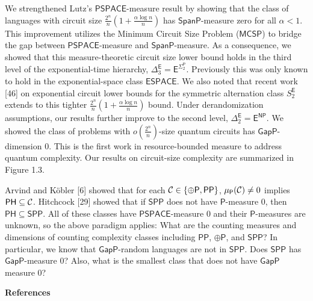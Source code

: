 We strengthened Lutz’s $\mathsf{PSPACE}$-measure result by showing that the class of languages with circuit size $\frac{2^{n}}{n}(1+\frac{\alpha\log n}{n})$ has $\mathsf{SpanP}$-measure zero for all $\alpha<1$. This improvement utilizes the Minimum Circuit Size Problem ($\mathsf{MCSP}$) to bridge the gap between $\mathsf{PSPACE}$-measure and $\mathsf{SpanP}$-measure. As a consequence, we showed that this measure-theoretic circuit size lower bound holds in the third level of the exponential-time hierarchy, $\Delta^{\mathsf{E}}_{3}=\mathsf{E}^{{\Sigma^{\mathsf{P}}_{2}}}$. Previously this was only known to hold in the exponential-space class $\mathsf{ESPACE}$. We also noted that recent work [46] on exponential circuit lower bounds for the symmetric alternation class $S^{\mathsf{E}}_{2}$ extends to this tighter $\frac{2^{n}}{n}(1+\frac{\alpha\log n}{n})$ bound. Under derandomization assumptions, our results further improve to the second level, $\Delta^{\mathsf{E}}_{2}=\mathsf{E}^{\mathsf{NP}}$. We showed the class of problems with $o\left(\frac{2^{n}}{n}\right)$-size quantum circuits has $\mathsf{GapP}$-dimension 0. This is the first work in resource-bounded measure to address quantum complexity.
Our results on circuit-size complexity are summarized in Figure 1.3.\par




Arvind and Köbler [6] showed that for
each ${\cal C}\in\{{\oplus\mathsf{P}},\mathsf{PP}\}$, $\mu_{\mathsf{P}}({\cal C})\not=0$ implies
$\mathsf{PH}\subseteq{\cal C}$. Hitchcock [29] showed that if $\mathsf{SPP}$ does not have $\mathsf{P}$-measure 0, then $\mathsf{PH}\subseteq\mathsf{SPP}$.
All of these classes have $\mathsf{PSPACE}$-measure 0 and their $\mathsf{P}$-measures are unknown, so the above paradigm applies:
What are the counting measures and dimensions of counting complexity classes including $\mathsf{PP}$, ${\oplus\mathsf{P}}$, and $\mathsf{SPP}$?
In particular, we know that $\mathsf{GapP}$-random languages are not in $\mathsf{SPP}$. Does $\mathsf{SPP}$ has $\mathsf{GapP}$-measure 0?
Also, what is the smallest class that does not have $\mathsf{GapP}$ measure 0?\par





\par\medskip\noindent\textbf{References}\par



